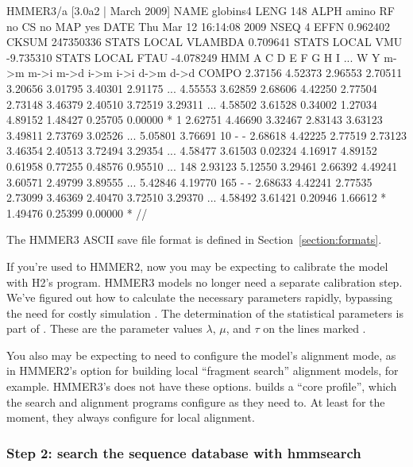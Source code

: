 \begin{sreoutput}
HMMER3/a [3.0a2 | March 2009]
NAME  globins4
LENG  148
ALPH  amino
RF    no
CS    no
MAP   yes
DATE  Thu Mar 12 16:14:08 2009
NSEQ  4
EFFN  0.962402
CKSUM 247350336
STATS LOCAL     VLAMBDA 0.709641
STATS LOCAL         VMU -9.735310
STATS LOCAL        FTAU -4.078249
HMM          A        C        D        E        F        G        H        I    ...   W        Y
            m->m     m->i     m->d     i->m     i->i     d->m     d->d
  COMPO   2.37156  4.52373  2.96553  2.70511  3.20656  3.01795  3.40301  2.91175 ... 4.55553  3.62859
          2.68606  4.42250  2.77504  2.73148  3.46379  2.40510  3.72519  3.29311 ... 4.58502  3.61528
          0.34002  1.27034  4.89152  1.48427  0.25705  0.00000        *
      1   2.62751  4.46690  3.32467  2.83143  3.63123  3.49811  2.73769  3.02526 ... 5.05801  3.76691     10 - -
          2.68618  4.42225  2.77519  2.73123  3.46354  2.40513  3.72494  3.29354 ... 4.58477  3.61503
          0.02324  4.16917  4.89152  0.61958  0.77255  0.48576  0.95510
...
    148   2.93123  5.12550  3.29461  2.66392  4.49241  3.60571  2.49799  3.89555 ... 5.42846  4.19770    165 - -
          2.68633  4.42241  2.77535  2.73099  3.46369  2.40470  3.72510  3.29370 ... 4.58492  3.61421
          0.20946  1.66612        *  1.49476  0.25399  0.00000        *
//
\end{sreoutput}

The HMMER3 ASCII save file format is defined in
Section~\ref{section:formats}.

If you're used to HMMER2, now you may be expecting to calibrate the
model with H2's  program. HMMER3 models no longer
need a separate calibration step. We've figured out how to calculate
the necessary parameters rapidly, bypassing the need for costly
simulation \citep{Eddy08}. The determination of the statistical
parameters is part of . These are the parameter values
$\lambda$, $\mu$, and $\tau$ on the lines marked .

You also may be expecting to need to configure the model's alignment
mode, as in HMMER2's  option for building local
``fragment search'' alignment models, for example. HMMER3's
 does not have these options.  builds a
``core profile'', which the search and alignment programs configure as
they need to. At least for the moment, they always configure for local
alignment.


\subsubsection{Step 2: search the sequence database with hmmsearch}

